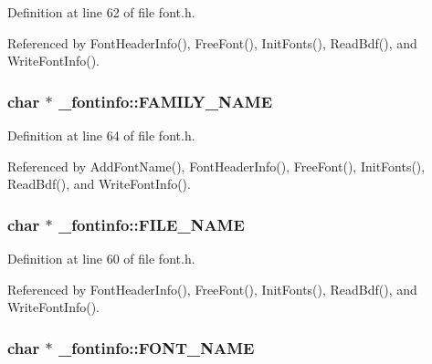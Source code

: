 Definition at line 62 of file font.\-h.



Referenced by Font\-Header\-Info(), Free\-Font(), Init\-Fonts(), Read\-Bdf(), and Write\-Font\-Info().

\hypertarget{struct__fontinfo_a4af43750caadb3ae9d7375f0afdcd171}{
\subsubsection[{F\-A\-M\-I\-L\-Y\-\_\-\-N\-A\-M\-E}]{\setlength{\rightskip}{0pt plus 5cm}char $\ast$ \-\_\-fontinfo\-::\-F\-A\-M\-I\-L\-Y\-\_\-\-N\-A\-M\-E}}\label{struct__fontinfo_a4af43750caadb3ae9d7375f0afdcd171}


Definition at line 64 of file font.\-h.



Referenced by Add\-Font\-Name(), Font\-Header\-Info(), Free\-Font(), Init\-Fonts(), Read\-Bdf(), and Write\-Font\-Info().

\hypertarget{struct__fontinfo_a86ca02a864b7dccb21004f51bea22ed3}{
\subsubsection[{F\-I\-L\-E\-\_\-\-N\-A\-M\-E}]{\setlength{\rightskip}{0pt plus 5cm}char $\ast$ \-\_\-fontinfo\-::\-F\-I\-L\-E\-\_\-\-N\-A\-M\-E}}\label{struct__fontinfo_a86ca02a864b7dccb21004f51bea22ed3}


Definition at line 60 of file font.\-h.



Referenced by Font\-Header\-Info(), Free\-Font(), Init\-Fonts(), Read\-Bdf(), and Write\-Font\-Info().

\hypertarget{struct__fontinfo_a6c0f76f2668446a1c37ecab8d4e286a5}{
\subsubsection[{F\-O\-N\-T\-\_\-\-N\-A\-M\-E}]{\setlength{\rightskip}{0pt plus 5cm}char $\ast$ \-\_\-fontinfo\-::\-F\-O\-N\-T\-\_\-\-N\-A\-M\-E}}\label{struct__fontinfo_a6c0f76f2668446a1c37ecab8d4e286a5}


